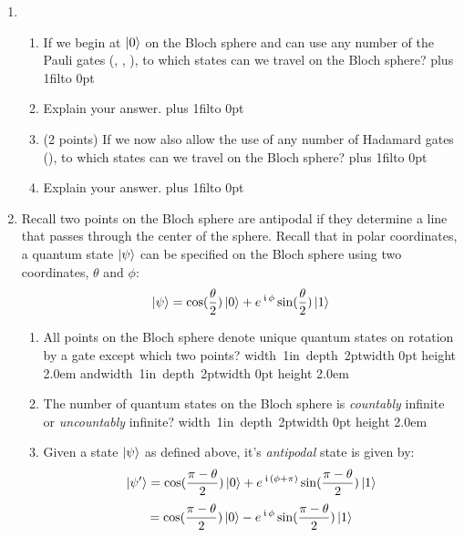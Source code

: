 \documentclass[12pt]{article}
\newcommand{\Blank}{\mbox{\hskip 4pt\vrule width 1in depth 2pt}\vrule width 0pt height 2.0em}
\def\DefaultSpace{1in}
\newcommand{\LeaveSpace}[1][\DefaultSpace]{%
\vskip #1 plus 1fil\relax\hbox to 0pt{\hss} %
}
\begin{document}
\begin{enumerate}[font=\bfseries]
\begin{enumerate}[label=\theenumi.\arabic*]
        \item {} If $a,b,c$ are all even what is the probability of observing $\ket{1}$ when we measure $\ket{\psi}$? \Blank{}
    \end{enumerate}
    \item {}
    \begin{enumerate}[label=\theenumi.\arabic*] \item {} If we begin at $\ket{0}$ on the Bloch sphere and can use any number of the Pauli gates (\PauliX{}, \PauliY{}, \PauliZ{}), to which states can we travel on the Bloch sphere? \LeaveSpace{}
    \item {} Explain your answer. 
    \LeaveSpace{}
    
    \item (2 points) If we now also allow the use of any number of Hadamard gates (\Hadamard{}), to which states can we travel on the Bloch sphere? \LeaveSpace{}
    \item {} Explain your answer. 
    \LeaveSpace{}
    \end{enumerate}
    \item {} Recall two points on the Bloch sphere are antipodal if they determine a line that passes through the center of the sphere. Recall that in polar coordinates, a quantum state $\ket{\psi}$ can be specified on the Bloch sphere using two coordinates, $\theta$ and $\phi$:
    \[\ket{\psi} = \cos(\frac{\theta}{2})\ket{0}
    + e^{\,\kern 0.5pt\mathfrak{i}\,\phi}\sin(\frac{\theta}{2})\ket{1}\]
    \begin{enumerate}[label=\theenumi.\arabic*]
        \item {} All points on the Bloch sphere denote unique quantum states on rotation by a \PauliZ{} gate except which two points? \Blank{} and\Blank{}
        \item {} The number of quantum states on the Bloch sphere is \emph{countably} infinite or \emph{uncountably} infinite? \Blank{}
        \item {} Given a state $\ket{\psi}$ as defined above, it's \emph{antipodal} state is given by:
        \[ \ket{\psi'} = \cos({\frac{\pi - \theta}{2})\ket{0}+e^{\,\kern 0.5pt\mathfrak{i}\,(\phi + \pi)}\sin({\frac{\pi - \theta}{2}})\ket{1}}
        \]
        \[
        = \cos({\frac{\pi - \theta}{2})\ket{0}-e^{\,\kern 0.5pt\mathfrak{i}\,\phi}\sin({\frac{\pi - \theta}{2}})\ket{1}}
        \]
        

\end{enumerate}
\end{enumerate}
\end{document}
